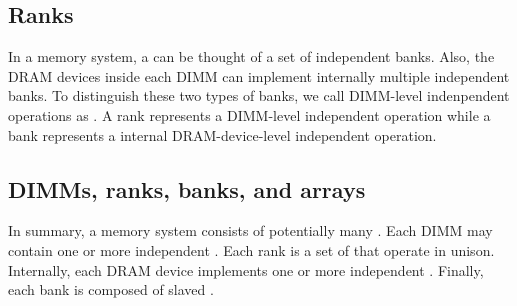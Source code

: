 \subsection{Ranks}
In a memory system, a  can be thought of a set of independent
banks. Also, the DRAM devices inside each DIMM can implement internally
multiple independent banks. To distinguish these two types of banks, we call
DIMM-level indenpendent operations as . A rank represents a DIMM-level independent operation
while a bank represents a internal DRAM-device-level independent operation. 

\subsection{DIMMs, ranks, banks, and arrays}
In summary, a memory system consists of potentially many . 
Each DIMM may contain one or more independent . 
Each rank is a set of  that operate in unison. 
Internally, each DRAM device implements one or more independent . 
Finally, each bank is composed of slaved .
